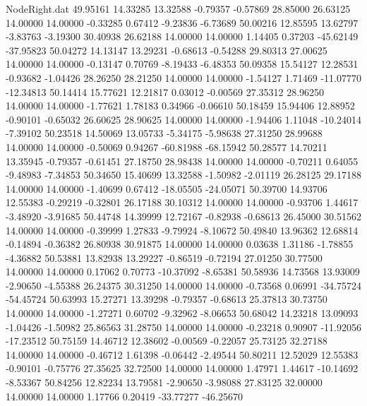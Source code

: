 \begin{filecontents}{NodeRight.dat}
  49.95161   14.33285   13.32588    -0.79357   -0.57869   28.85000   26.63125   14.00000   14.00000   -0.33285    0.67412   -9.23836   -6.73689
  50.00216   12.85595   13.62797    -3.83763   -3.19300   30.40938   26.62188   14.00000   14.00000    1.14405    0.37203  -45.62149  -37.95823
  50.04272   14.13147   13.29231    -0.68613   -0.54288   29.80313   27.00625   14.00000   14.00000   -0.13147    0.70769   -8.19433   -6.48353
  50.09358   15.54127   12.28531    -0.93682   -1.04426   28.26250   28.21250   14.00000   14.00000   -1.54127    1.71469  -11.07770  -12.34813
  50.14414   15.77621   12.21817     0.03012   -0.00569   27.35312   28.96250   14.00000   14.00000   -1.77621    1.78183    0.34966   -0.06610
  50.18459   15.94406   12.88952    -0.90101   -0.65032   26.60625   28.90625   14.00000   14.00000   -1.94406    1.11048  -10.24014   -7.39102
  50.23518   14.50069   13.05733    -5.34175   -5.98638   27.31250   28.99688   14.00000   14.00000   -0.50069    0.94267  -60.81988  -68.15942
  50.28577   14.70211   13.35945    -0.79357   -0.61451   27.18750   28.98438   14.00000   14.00000   -0.70211    0.64055   -9.48983   -7.34853
  50.34650   15.40699   13.32588    -1.50982   -2.01119   26.28125   29.17188   14.00000   14.00000   -1.40699    0.67412  -18.05505  -24.05071
  50.39700   14.93706   12.55383    -0.29219   -0.32801   26.17188   30.10312   14.00000   14.00000   -0.93706    1.44617   -3.48920   -3.91685
  50.44748   14.39999   12.72167    -0.82938   -0.68613   26.45000   30.51562   14.00000   14.00000   -0.39999    1.27833   -9.79924   -8.10672
  50.49840   13.96362   12.68814    -0.14894   -0.36382   26.80938   30.91875   14.00000   14.00000    0.03638    1.31186   -1.78855   -4.36882
  50.53881   13.82938   13.29227    -0.86519   -0.72194   27.01250   30.77500   14.00000   14.00000    0.17062    0.70773  -10.37092   -8.65381
  50.58936   14.73568   13.93009    -2.90650   -4.55388   26.24375   30.31250   14.00000   14.00000   -0.73568    0.06991  -34.75724  -54.45724
  50.63993   15.27271   13.39298    -0.79357   -0.68613   25.37813   30.73750   14.00000   14.00000   -1.27271    0.60702   -9.32962   -8.06653
  50.68042   14.23218   13.09093    -1.04426   -1.50982   25.86563   31.28750   14.00000   14.00000   -0.23218    0.90907  -11.92056  -17.23512
  50.75159   14.46712   12.38602    -0.00569   -0.22057   25.73125   32.27188   14.00000   14.00000   -0.46712    1.61398   -0.06442   -2.49544
  50.80211   12.52029   12.55383    -0.90101   -0.75776   27.35625   32.72500   14.00000   14.00000    1.47971    1.44617  -10.14692   -8.53367
  50.84256   12.82234   13.79581    -2.90650   -3.98088   27.83125   32.00000   14.00000   14.00000    1.17766    0.20419  -33.77277  -46.25670

\end{filecontents}
